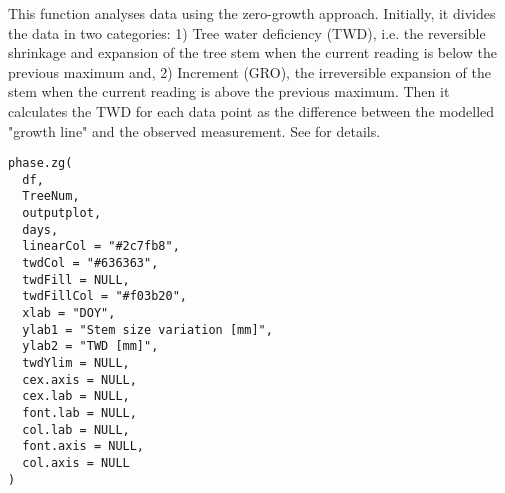 \documentclass[a4paper]{book}
\begin{document}
%
\begin{Description}\relax
This function analyses data using the zero-growth approach. Initially, it divides the data in two categories: 1) Tree water deficiency (TWD), i.e. the reversible shrinkage and expansion of the tree stem when the current reading is below the previous maximum and, 2) Increment (GRO), the irreversible expansion of the stem when the current reading is above the previous maximum. Then it calculates the TWD for each data point as the difference between the modelled "growth line" and the observed measurement. See  for details.
\end{Description}
%
\begin{Usage}
\begin{verbatim}
phase.zg(
  df,
  TreeNum,
  outputplot,
  days,
  linearCol = "#2c7fb8",
  twdCol = "#636363",
  twdFill = NULL,
  twdFillCol = "#f03b20",
  xlab = "DOY",
  ylab1 = "Stem size variation [mm]",
  ylab2 = "TWD [mm]",
  twdYlim = NULL,
  cex.axis = NULL,
  cex.lab = NULL,
  font.lab = NULL,
  col.lab = NULL,
  font.axis = NULL,
  col.axis = NULL
)
\end{verbatim}
\end{Usage}
%
\end{document}
